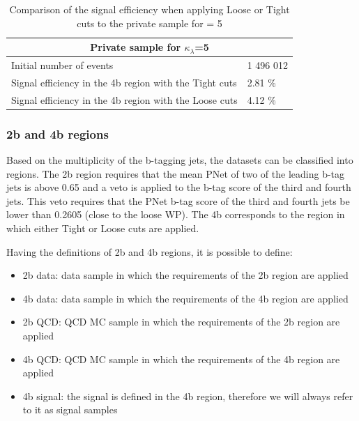  \begin{table}[hbt]
     \centering
      \begin{tabular}{ |p{10cm}|p{3cm}| }
         \hline
         \multicolumn{2}{|c|}{Private sample for $\kappa_\lambda$=5} \\
         \hline
         Initial number of events & 1 496 012 \\
         Signal efficiency in the 4b region with the Tight cuts  & 2.81 \% \\
         Signal efficiency in the 4b region with the Loose cuts  &  4.12 \% \\
         \hline
 \end{tabular}
 \caption{Comparison of the signal efficiency when applying Loose or Tight cuts to the private sample for \kl = 5}
 \label{table: SE kl 5}
\end{table}

\subsubsection{2b and 4b regions}

Based on the multiplicity of the b-tagging jets, the datasets can be classified into regions. The 2b region requires that the mean PNet of two of the leading b-tag jets is above 0.65 and a veto is applied to the b-tag score of the third and fourth jets. This veto requires that the PNet b-tag score of the third and fourth jets be lower than 0.2605 (close to the loose WP). The 4b corresponds to the region in which either Tight or Loose cuts are applied.

Having the definitions of 2b and 4b regions, it is possible to define:
\begin{itemize}
    \item 2b data: data sample in which the requirements of the 2b region are applied
    \item 4b data: data sample in which the requirements of the 4b region are applied
    \item 2b QCD: QCD MC sample in which the requirements of the 2b region are applied
    \item 4b QCD: QCD MC sample in which the requirements of the 4b region are applied
    \item 4b signal: the signal is defined in the 4b region, therefore we will always refer to it as signal samples
    
\end{itemize}

\clearpage



